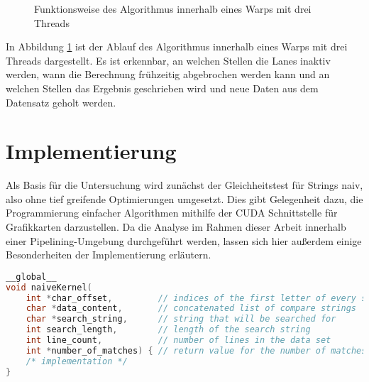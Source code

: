 \begin{figure}[ht]
	\caption{Funktionsweise des Algorithmus innerhalb eines Warps mit drei Threads}
	\label{equals_naiv_algorithmus}
\end{figure}

In Abbildung \ref{equals_naiv_algorithmus} ist der Ablauf des Algorithmus innerhalb eines Warps mit drei Threads dargestellt.
Es ist erkennbar, an welchen Stellen die Lanes inaktiv werden, wann die Berechnung frühzeitig abgebrochen werden kann und an welchen Stellen das Ergebnis geschrieben wird und neue Daten aus dem Datensatz geholt werden.

\section{Implementierung}

Als Basis für die Untersuchung wird zunächst der Gleichheitstest für Strings naiv, also ohne tief greifende Optimierungen umgesetzt.
Dies gibt Gelegenheit dazu, die Programmierung einfacher Algorithmen mithilfe der CUDA Schnittstelle für Grafikkarten darzustellen.
Da die Analyse im Rahmen dieser Arbeit innerhalb einer Pipelining-Umgebung durchgeführt werden, lassen sich hier außerdem einige Besonderheiten der Implementierung erläutern.

\newpage

\begin{lstlisting}[language=C++,
caption=Methodensignatur des Kernels,
label=naive_equals_signature]
__global__
void naiveKernel(
	int *char_offset,         // indices of the first letter of every string
	char *data_content,       // concatenated list of compare strings 
	char *search_string,      // string that will be searched for
	int search_length,        // length of the search string
	int line_count,           // number of lines in the data set
	int *number_of_matches) { // return value for the number of matches
	/* implementation */
}
\end{lstlisting}

